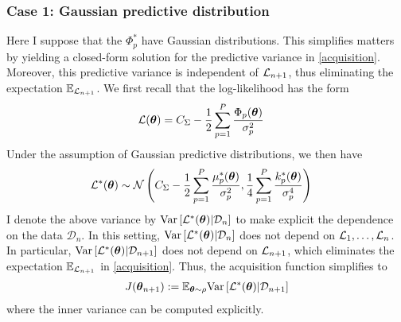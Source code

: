 \documentclass[12pt]{article}
\begin{document}
\subsubsection{Case 1: Gaussian predictive distribution}
Here I suppose that the $\Phi_p^*$ have Gaussian distributions. This simplifies matters by yielding a closed-form solution for the predictive variance in \ref{acquisition}. Moreover, 
this predictive variance is independent of $\mathcal{L}_{n+1}$, thus eliminating the expectation $\mathbb{E}_{\mathcal{L}_{n+1}}$. We first recall that the log-likelihood has the form 
\begin{align*}
\mathcal{L}(\boldsymbol{\theta}) &= C_\Sigma - \frac{1}{2} \sum_{p = 1}^{P} \frac{\Phi_p(\boldsymbol{\theta})}{\sigma_p^2}
\end{align*} 
Under the assumption of Gaussian predictive distributions, we then have 
\begin{align*}
\mathcal{L}^*(\boldsymbol{\theta}) &\sim \mathcal{N}\left(C_\Sigma - \frac{1}{2} \sum_{p = 1}^{P} \frac{\mu^*_p(\boldsymbol{\theta})}{\sigma_p^2}, \frac{1}{4} \sum_{p = 1}^{P} \frac{k^*_p(\boldsymbol{\theta})}{\sigma_p^4}  \right)
\end{align*}
I denote the above variance by $\mathrm{Var}\left[\mathcal{L}^*(\boldsymbol{\theta}) | \mathcal{D}_n \right]$ to make explicit the dependence on the data $\mathcal{D}_n$. In this setting, 
$\mathrm{Var}\left[\mathcal{L}^*(\boldsymbol{\theta}) | \mathcal{D}_n \right]$ does not depend on $\mathcal{L}_1, \dots, \mathcal{L}_n$. In particular, $\mathrm{Var}\left[\mathcal{L}^*(\boldsymbol{\theta}) | \mathcal{D}_{n+1} \right]$
does not depend on $\mathcal{L}_{n+1}$, which eliminates the expectation $\mathbb{E}_{\mathcal{L}_{n+1}}$ in \ref{acquisition}. 
Thus, the acquisition function simplifies to 
\begin{align}
J(\boldsymbol{\theta}_{n+1}) := \mathbb{E}_{\boldsymbol{\theta} \sim \rho} \mathrm{Var}\left[\mathcal{L}^*(\boldsymbol{\theta}) | \mathcal{D}_{n+1} \right] \label{acquisition_Gaussian_case}
\end{align}
where the inner variance can be computed explicitly. 
\end{document}
